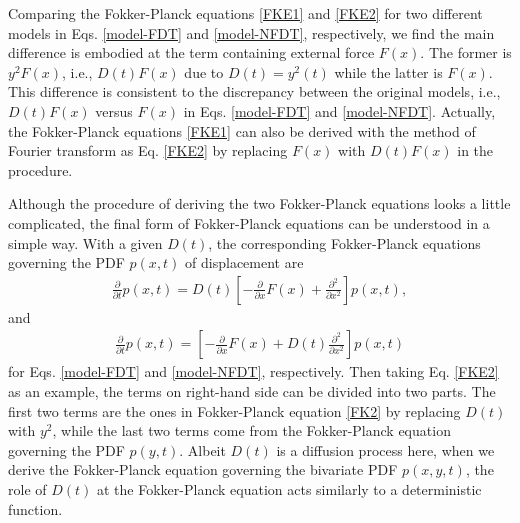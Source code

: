 \documentclass[aps,pre,twocolumn,groupedaddress,longbibliography]{revtex4-2}
\begin{document}
Comparing the Fokker-Planck equations \eqref{FKE1} and \eqref{FKE2} for two different models in Eqs. \eqref{model-FDT} and \eqref{model-NFDT}, respectively, we find the main difference is embodied at the term containing external force $F(x)$. The former is $y^2F(x)$, i.e., $D(t)F(x)$ due to $D(t)=y^2(t)$ while the latter is $F(x)$. This difference is consistent to the discrepancy between the original models, i.e., $D(t)F(x)$ versus $F(x)$ in Eqs. \eqref{model-FDT} and \eqref{model-NFDT}. Actually, the Fokker-Planck equations \eqref{FKE1} can also be derived with the method of Fourier transform as Eq. \eqref{FKE2} by replacing $F(x)$ with $D(t)F(x)$ in the procedure.

Although the procedure of deriving the two Fokker-Planck equations looks a little complicated, the final form of Fokker-Planck equations can be understood in a simple way.
With a given $D(t)$, the corresponding Fokker-Planck equations governing the PDF $p(x,t)$ of displacement are
\begin{equation}\label{FK1}
\begin{split}
\frac{\partial}{\partial t}p(x,t)=D(t)\left[-\frac{\partial}{\partial x}F(x)+\frac{\partial^2}{\partial x^2}\right]p(x,t),
\end{split}
\end{equation}
and
\begin{equation}\label{FK2}
\begin{split}
\frac{\partial}{\partial t}p(x,t)=\left[-\frac{\partial}{\partial x}F(x)+D(t)\frac{\partial^2}{\partial x^2}\right]p(x,t)
\end{split}
\end{equation}
for Eqs. \eqref{model-FDT} and \eqref{model-NFDT}, respectively.
Then taking Eq. \eqref{FKE2} as an example, the terms on right-hand side can be divided into two parts. The first two terms are the ones in Fokker-Planck equation \eqref{FK2} by replacing $D(t)$ with $y^2$, while the last two terms come from the Fokker-Planck equation governing the PDF $p(y,t)$.
Albeit $D(t)$ is a diffusion process here, when we derive the Fokker-Planck equation governing the bivariate PDF $p(x,y,t)$, the role of $D(t)$ at the Fokker-Planck equation acts similarly to a deterministic function.
\end{document}
